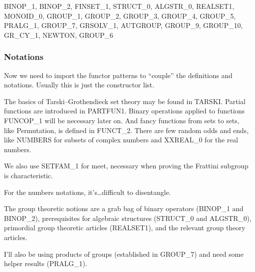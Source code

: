 \nwenddocs{}\endmoddef\nwstartdeflinemarkup{}\nwenddeflinemarkup
BINOP_1, BINOP_2, FINSET_1, STRUCT_0, ALGSTR_0, REALSET1, MONOID_0,
GROUP_1, GROUP_2, GROUP_3, GROUP_4, GROUP_5, PRALG_1, GROUP_7, GRSOLV_1,
AUTGROUP, GROUP_9, GROUP_10, GR_CY_1, NEWTON, GROUP_6
\nwendcode{}\nwdocspar

\subsubsection{Notations}
Now we need to import the functor patterns to ``couple'' the definitions
and notations. Usually this is just the constructor list.

The basics of Tarski--Grothendieck set theory may be found in
{\Tt{}TARSKI\nwendquote}. Partial functions are introduced in {\Tt{}PARTFUN1\nwendquote}. Binary
operations applied to functions {\Tt{}FUNCOP{\_}1\nwendquote} will be necessary later
on. And fancy functions from sets to sets, like {\Tt{}Permutation\nwendquote}, is
defined in {\Tt{}FUNCT{\_}2\nwendquote}. There are few random odds and ends, like
{\Tt{}NUMBERS\nwendquote} for subsets of complex numbers and {\Tt{}XXREAL{\_}0\nwendquote} for the real
numbers.

We also use {\Tt{}SETFAM{\_}1\nwendquote} for {\Tt{}meet\nwendquote}, necessary when proving the
Frattini subgroup is characteristic.

For the numbers notations, it's\dots difficult to disentangle.

The group theoretic notions are a grab bag of binary operators
({\Tt{}BINOP{\_}1\nwendquote} and {\Tt{}BINOP{\_}2\nwendquote}), prerequisites for algebraic structures
({\Tt{}STRUCT{\_}0\nwendquote} and {\Tt{}ALGSTR{\_}0\nwendquote}), primordial group theoretic articles
({\Tt{}REALSET1\nwendquote}), and the relevant group theory articles.

I'll also be using products of groups (established in {\Tt{}GROUP{\_}7\nwendquote}) and
need some helper results ({\Tt{}PRALG{\_}1\nwendquote}).

